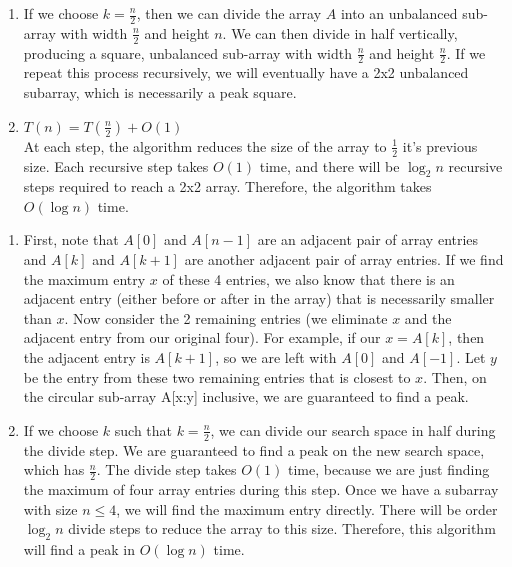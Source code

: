 \documentclass[12pt,twoside]{article}
\begin{document}
\begin{problems}
\begin{problemparts}
\begin {enumerate}
\begin {itemize}
	\end {itemize}

	\item If we choose $k=\frac{n}{2}$, then we can divide the array $A$ into an unbalanced sub-array with width $\frac{n}{2}$ and height $n$. We can then divide in half vertically, producing a square, unbalanced sub-array with width $\frac{n}{2}$ and height  $\frac{n}{2}$. If we repeat this process recursively, we will eventually have a 2x2 unbalanced subarray, which is necessarily a peak square.
	
	
	\item $T(n)= T(\frac{n}{2}) + O(1) $ \\
	At each step, the algorithm reduces the size of the array to $\frac{1}{2}$ it's previous size. Each recursive step takes $O(1)$ time, and there will be $\log_2n$ recursive steps required to reach a 2x2 array. Therefore, the algorithm takes $O(\log n)$ time.


\end {enumerate}

\problempart

\begin{enumerate}

	\item First, note that $A[0]$ and $A[n-1]$ are an adjacent pair of array entries and $A[k]$ and $A[k+1]$ are another adjacent pair of array entries. If we find the maximum entry $x$ of these 4 entries, we also know that there is an adjacent entry (either before or after in the array) that is necessarily smaller than $x$. Now consider the 2 remaining entries (we eliminate $x$ and the adjacent entry from our original four). For example, if our $x=A[k]$, then the adjacent entry is $A[k+1]$, so we are left with $A[0]$ and $A[-1]$. Let $y$ be the entry from these two remaining entries that is closest to $x$. Then, on the circular sub-array A[x:y] inclusive, we are guaranteed to find a peak.

	\item If we choose $k$ such that $k=\frac{n}{2}$, we can divide our search space in half during the divide step. We are guaranteed to find a peak on the new search space, which has $\frac{n}{2}$. The divide step takes $O(1)$ time, because we are just finding the maximum of four array entries during this step. Once we have a subarray with size $n\leq4$, we will find the maximum entry directly. There will be order $\log_2 n$ divide steps to reduce the array to this size. Therefore, this algorithm will find a peak in $O(\log n)$ time.
	

\end{enumerate}
\end{problemparts}
\end{problems}
\end{document}
